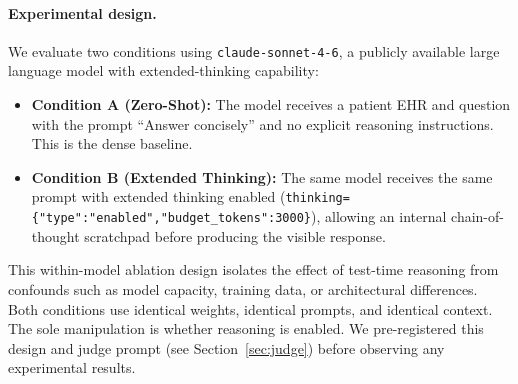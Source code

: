 \documentclass{article}
\begin{document}
\paragraph{Experimental design.}
We evaluate two conditions using \texttt{claude-sonnet-4-6}, a publicly
available large language model with extended-thinking capability:
\begin{itemize}
  \item \textbf{Condition A (Zero-Shot):} The model receives a patient EHR
    and question with the prompt ``Answer concisely'' and no explicit
    reasoning instructions. This is the dense baseline.
  \item \textbf{Condition B (Extended Thinking):} The same model receives the
    same prompt with extended thinking enabled
    (\texttt{thinking=\{"type":"enabled","budget\_tokens":3000\}}),
    allowing an internal chain-of-thought scratchpad before producing
    the visible response.
\end{itemize}
This within-model ablation design isolates the effect of test-time
reasoning from confounds such as model capacity, training data, or
architectural differences. Both conditions use identical weights, identical
prompts, and identical context. The sole manipulation is whether reasoning
is enabled. We pre-registered this design and judge prompt
(see Section~\ref{sec:judge}) before observing any experimental results.
\end{document}
